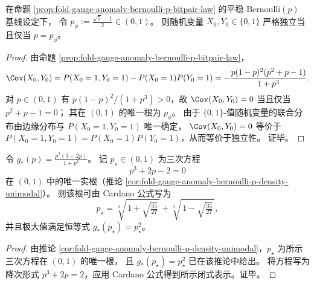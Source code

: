 
\begin{corollary}\label{cor:fold-gauge-anomaly-bernoulli-p-bitpair-independence-threshold}
在命题 \ref{prop:fold-gauge-anomaly-bernoulli-p-bitpair-law} 的平稳 Bernoulli\((p)\) 基线设定下，
令 \(p_\phi:=\frac{\sqrt5-1}{2}\in(0,1)\)。
则随机变量 \(X_0,Y_0\in\{0,1\}\) 严格独立当且仅当 \(p=p_\phi\)。
\end{corollary}
\begin{proof}
由命题 \ref{prop:fold-gauge-anomaly-bernoulli-p-bitpair-law}，
\[
\Cov(X_0,Y_0)
=P(X_0=1,Y_0=1)-P(X_0=1)P(Y_0=1)
=-\frac{p(1-p)^2(p^2+p-1)}{1+p^3}.
\]
对 \(p\in(0,1)\) 有 \(p(1-p)^2/(1+p^3)>0\)，故 \(\Cov(X_0,Y_0)=0\) 当且仅当 \(p^2+p-1=0\)；
其在 \((0,1)\) 的唯一根为 \(p_\phi\)。
由于 \(\{0,1\}\)-值随机变量的联合分布由边缘分布与 \(P(X_0=1,Y_0=1)\) 唯一确定，
\(\Cov(X_0,Y_0)=0\) 等价于 \(P(X_0=1,Y_0=1)=P(X_0=1)P(Y_0=1)\)，从而等价于独立性。
证毕。
\end{proof}

\begin{corollary}\label{cor:fold-gauge-anomaly-bernoulli-p-density-maximizer-cardano}
令 \(g_\ast(p)=\frac{p^2(3-2p)}{1+p^3}\)。
记 \(p_\star\in(0,1)\) 为三次方程
\[
p^3+2p-2=0
\]
在 \((0,1)\) 中的唯一实根（推论 \ref{cor:fold-gauge-anomaly-bernoulli-p-density-unimodal}）。
则该根可由 Cardano 公式写为
\[
p_\star=\sqrt[3]{\,1+\sqrt{\tfrac{35}{27}}\,}+\sqrt[3]{\,1-\sqrt{\tfrac{35}{27}}\,},
\]
并且极大值满足恒等式 \(g_\ast(p_\star)=p_\star^2\)。
\end{corollary}
\begin{proof}
由推论 \ref{cor:fold-gauge-anomaly-bernoulli-p-density-unimodal}，\(p_\star\) 为所示三次方程在 \((0,1)\) 的唯一根，
且 \(g_\ast(p_\star)=p_\star^2\) 已在该推论中给出。
将方程写为降次形式 \(p^3+2p=2\)，应用 Cardano 公式得到所示闭式表示。证毕。
\end{proof}

